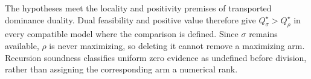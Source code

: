 The hypotheses meet the locality and positivity premises of transported dominance duality.  Dual feasibility and positive value therefore give \(Q_\sigma^\star>Q_\rho^\star\) in every compatible model where the comparison is defined.  Since \(\sigma\) remains available, \(\rho\) is never maximizing, so deleting it cannot remove a maximizing arm.  Recursion soundness classifies uniform zero evidence as undefined before division, rather than assigning the corresponding arm a numerical rank.